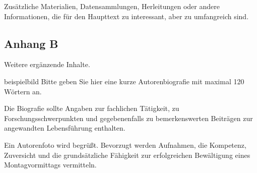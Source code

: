 \documentclass[research]{zal}
\begin{document}
Zusätzliche Materialien, Datensammlungen, Herleitungen oder andere Informationen, die für den Haupttext zu interessant, aber zu umfangreich sind.

\subsection*{Anhang B}

Weitere ergänzende Inhalte.




\begin{biography}{beispielbild}
	Bitte geben Sie hier eine kurze Autorenbiografie mit maximal 120 Wörtern an.
	
	Die Biografie sollte Angaben zur fachlichen Tätigkeit, zu Forschungsschwerpunkten und gegebenenfalls zu bemerkenswerten Beiträgen zur angewandten Lebensführung enthalten.
	
	Ein Autorenfoto wird begrüßt. Bevorzugt werden Aufnahmen, die Kompetenz, Zuversicht und die grundsätzliche Fähigkeit zur erfolgreichen Bewältigung eines Montagvormittags vermitteln.
\end{biography}
\end{document}
